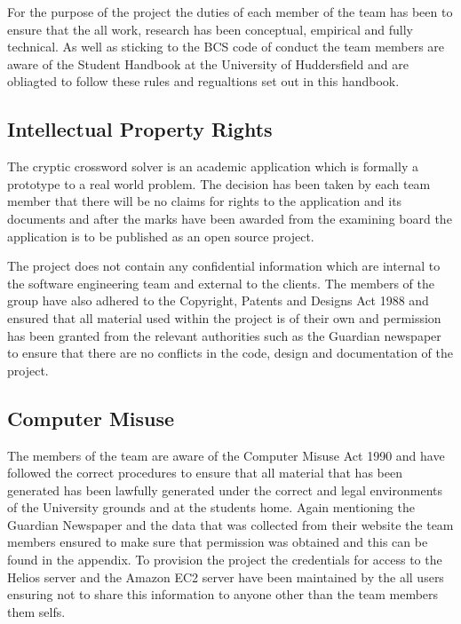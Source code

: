 For the purpose of the project the duties of each member of the team has been to ensure that the all work, research has been conceptual, empirical and fully technical. As well as sticking to the BCS code of conduct the team members are aware of the Student Handbook at the University of Huddersfield and are obliagted to follow these rules and regualtions set out in this handbook.

\subsection{Intellectual Property Rights}

The cryptic crossword solver is an academic application which is formally a prototype to a real world problem. The decision has been taken by each team member that there will be no claims for rights to the application and its documents and after the marks have been awarded from the examining board the application is to be published as an open source project. 

The project does not contain any confidential information which are internal to the software engineering team and external to the clients. The members of the group have also adhered to the Copyright, Patents and Designs Act 1988 and ensured that all material used within the project is of their own and permission has been granted from the relevant authorities such as the Guardian newspaper to ensure that there are no conflicts in the code, design and documentation of the project. 

\subsection{Computer Misuse}

The members of the team are aware of the Computer Misuse Act 1990 and have followed the correct procedures to ensure that all material that has been generated has been lawfully generated under the correct and legal environments of the University grounds and at the students home. Again mentioning the Guardian Newspaper and the data that was collected from their website the team members ensured to make sure that permission was obtained and this can be found in the appendix. To provision the project the credentials for access to the Helios server and the Amazon EC2 server have been maintained by the all users ensuring not to share this information to anyone other than the team members them selfs.

